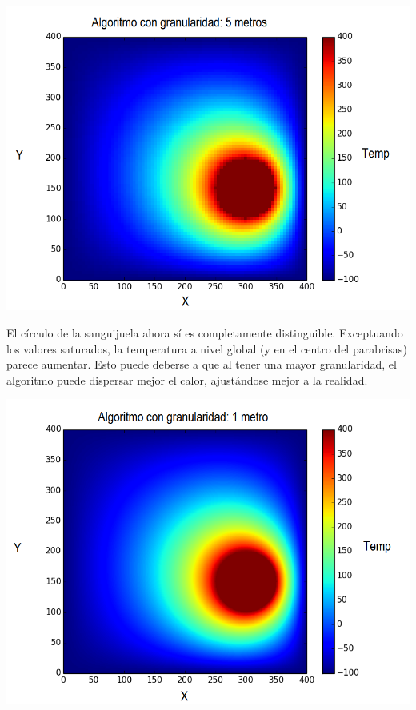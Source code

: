 	\begin{center}
		\includegraphics[scale=0.5]{./img/granularidad/g5_t400_sinkill.png}
	\end{center}

	El círculo de la sanguijuela ahora sí es completamente distinguible. Exceptuando los valores saturados, la temperatura a nivel global (y en el centro del parabrisas) parece aumentar. Esto puede deberse a que al tener una mayor granularidad, el algoritmo puede dispersar mejor el calor, ajustándose mejor a la realidad.

	\begin{center}
		\includegraphics[scale=0.5]{./img/granularidad/g1_t400_sinkill.png}
	\end{center}

